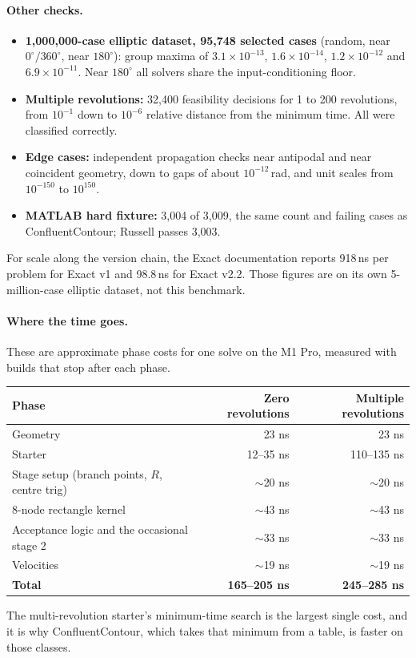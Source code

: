 \documentclass[11pt]{article}
\begin{document}
\paragraph{Other checks.}
\begin{itemize}
  \item \textbf{1,000,000-case elliptic dataset, 95,748 selected cases} (random, near $0^\circ/360^\circ$, near $180^\circ$): group maxima of $3.1\times10^{-13}$, $1.6\times10^{-14}$, $1.2\times10^{-12}$ and $6.9\times10^{-11}$. Near $180^\circ$ all solvers share the input-conditioning floor.
  \item \textbf{Multiple revolutions:} 32,400 feasibility decisions for 1 to 200 revolutions, from $10^{-1}$ down to $10^{-6}$ relative distance from the minimum time. All were classified correctly.
  \item \textbf{Edge cases:} independent propagation checks near antipodal and near coincident geometry, down to gaps of about $10^{-12}$\,rad, and unit scales from $10^{-150}$ to $10^{150}$.
  \item \textbf{MATLAB hard fixture:} 3,004 of 3,009, the same count and failing cases as ConfluentContour; Russell passes 3,003.
\end{itemize}
For scale along the version chain, the Exact documentation reports 918\,ns per problem for Exact v1 and 98.8\,ns for Exact v2.2. Those figures are on its own 5-million-case elliptic dataset, not this benchmark.

\paragraph{Where the time goes.} These are approximate phase costs for one solve on the M1 Pro, measured with builds that stop after each phase.
\begin{center}
\small
\begin{tabular}{l r r}
\toprule
Phase & Zero revolutions & Multiple revolutions \\
\midrule
Geometry & 23 ns & 23 ns \\
Starter & 12--35 ns & 110--135 ns \\
Stage setup (branch points, $R$, centre trig) & $\sim$20 ns & $\sim$20 ns \\
8-node rectangle kernel & $\sim$43 ns & $\sim$43 ns \\
Acceptance logic and the occasional stage 2 & $\sim$33 ns & $\sim$33 ns \\
Velocities & $\sim$19 ns & $\sim$19 ns \\
\midrule
\textbf{Total} & \textbf{165--205 ns} & \textbf{245--285 ns} \\
\bottomrule
\end{tabular}
\end{center}
The multi-revolution starter's minimum-time search is the largest single cost, and it is why ConfluentContour, which takes that minimum from a table, is faster on those classes.
\end{document}
